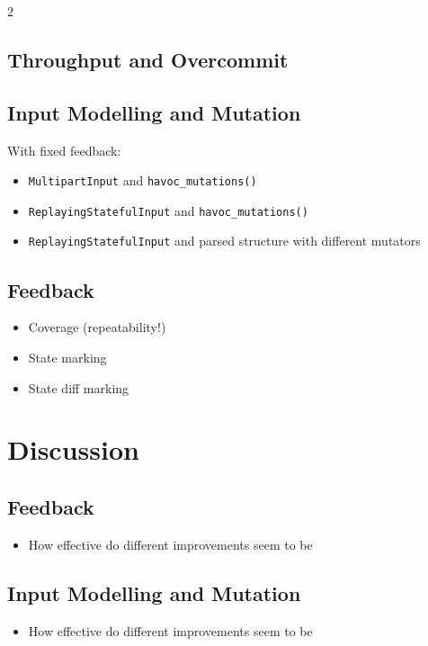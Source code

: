 \documentclass{article}
\newcommand{\code}[2][]{\lstinline[language=#1, breaklines=false, basicstyle=\ttfamily]{#2}}
\begin{document}
\begin{multicols}{2}
  \subsection{Throughput and Overcommit}

  \subsection{Input Modelling and Mutation}
  With fixed feedback:

  \begin{itemize}
    \item \code[Rust]{MultipartInput} and \code[Rust]{havoc_mutations()}
    \item \code[Rust]{ReplayingStatefulInput} and \code[Rust]{havoc_mutations()}
    \item \code[Rust]{ReplayingStatefulInput} and parsed structure with different mutators
  \end{itemize}

  \subsection{Feedback}
  \begin{itemize}
    \item Coverage (repeatability!)
    \item State marking
    \item State diff marking
  \end{itemize}


  \section{Discussion}
  \label{Discussion}

  \subsection{Feedback}
  \begin{itemize}
    \item How effective do different improvements seem to be
  \end{itemize}
  \subsection{Input Modelling and Mutation}
  \begin{itemize}
    \item How effective do different improvements seem to be
  \end{itemize}


\end{multicols}
\end{document}
